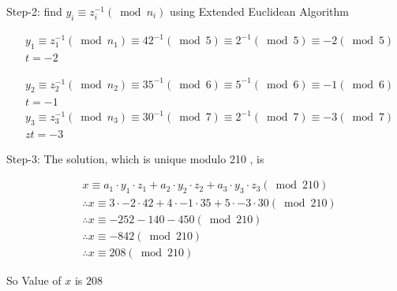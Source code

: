 \documentclass[11pt]{article}
\begin{document}
Step-2: find $y_i \equiv z_i^{-1}\left(\bmod n_i\right)$ using Extended Euclidean Algorithm

$$
    \begin{aligned}
         & y_1 \equiv z_1^{-1}\left(\bmod n_1\right) \equiv 42^{-1}(\bmod 5) \equiv 2^{-1}(\bmod 5) \equiv-2(\bmod 5) \\
         & t=-2
    \end{aligned}
$$

$$
    \begin{aligned}
         & y_2 \equiv z_2^{-1}\left(\bmod n_2\right) \equiv 35^{-1}(\bmod 6) \equiv 5^{-1}(\bmod 6) \equiv-1(\bmod 6) \\
         & t=-1                                                                                                       \\
         & y_3 \equiv z_3^{-1}\left(\bmod n_3\right) \equiv 30^{-1}(\bmod 7) \equiv 2^{-1}(\bmod 7) \equiv-3(\bmod 7) \\
         & zt=-3
    \end{aligned}
$$

Step-3: The solution, which is unique modulo 210 , is

$$
    \begin{aligned}
         & x \equiv a_1 \cdot y_1 \cdot z_1+a_2 \cdot y_2 \cdot z_2+a_3 \cdot y_3 \cdot z_3(\bmod 210) \\
         & \therefore x \equiv 3 \cdot-2 \cdot 42+4 \cdot-1 \cdot 35+5 \cdot-3 \cdot 30(\bmod 210)     \\
         & \therefore x \equiv-252-140-450(\bmod 210)                                                  \\
         & \therefore x \equiv-842(\bmod 210)                                                          \\
         & \therefore x \equiv 208(\bmod 210)
    \end{aligned}
$$

So Value of $x$ is $208$
\end{document}
